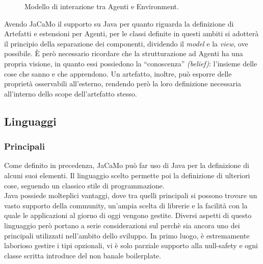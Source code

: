 \documentclass[12pt,a4paper,openright,oneside]{report}
\newcommand{\quotes}[1]{``#1''}
\begin{document}
\begin{figure}[h]
	\centering
	\caption{Modello di interazione tra Agenti e Environment.}
	\label{fig:jacamo}
\end{figure}

Avendo JaCaMo il supporto su Java per quanto riguarda la definizione di Artefatti e estensioni per Agenti, per le classi definite in questi ambiti si adotterà il principio della separazione dei componenti, dividendo il \textit{model} e la \textit{view}, ove possibile. È però necessario ricordare che la strutturazione ad Agenti ha una propria visione, in quanto essi possiedono la \quotes{conoscenza} \textit{(belief)}: l'insieme delle cose che sanno e che apprendono. Un artefatto, inoltre, può esporre delle proprietà osservabili all'esterno, rendendo però la loro definizione necessaria all'interno dello scope dell'artefatto stesso.

\subsection{Linguaggi}

\subsubsection{Principali}
Come definito in precedenza, JaCaMo può far uso di Java per la definizione di alcuni suoi elementi. Il linguaggio scelto permette poi la definizione di ulteriori cose, seguendo un classico stile di programmazione.\\

Java possiede molteplici vantaggi, dove tra quelli principali si possono trovare un vasto supporto della community, un'ampia scelta di librerie e la facilità con la quale le applicazioni al giorno di oggi vengono gestite. Diversi aspetti di questo linguaggio però portano a serie considerazioni sul perchè sia ancora uno dei principali utilizzati nell'ambito dello sviluppo. In primo luogo, è estremamente laborioso gestire i tipi opzionali, vi è solo parziale supporto alla null-safety e ogni classe scritta introduce del non banale boilerplate.\\
\end{document}
